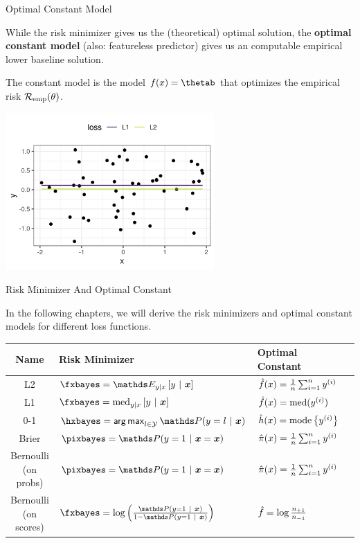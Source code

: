 \begin{vbframe}{Optimal Constant Model}

While the risk minimizer gives us the (theoretical) optimal solution, the \textbf{optimal constant model} (also: featureless predictor) gives us an computable empirical lower baseline solution.

\vspace*{0.2cm}

The constant model is the model $\fx = \thetab$ that optimizes the empirical risk $\mathcal{R}_{\text{emp}}(\theta)$.

\vspace*{-0.5cm}

\begin{center}
	\includegraphics[width = 0.6\textwidth]{figure_man/l1_vs_l2.png}
\end{center}

\end{vbframe}

\begin{vbframe}{Risk Minimizer And Optimal Constant}

In the following chapters, we will derive the risk minimizers and optimal constant models for different loss functions. 

\begin{table}[] 
\footnotesize
\renewcommand{\arraystretch}{1.5} %
  \begin{tabular}{c|lll}
  Name & Risk Minimizer & Optimal Constant\\ \hline
  L2 & $\fxbayes = \E_{y|x} \left[y ~|~ \xv \right]$ & $\hat{f}(x) = \frac{1}{n} \sum_{i=1}^n y^{(i)}$ \\
  L1 & $\fxbayes = \text{med}_{y|x} \left[y ~|~ \xv \right]$ & $\hat{f}(x) = \text{med}(y^{(i)})$\\
  0-1 & $\hxbayes = \argmax_{l \in \Yspace} \P(y = l~|~ \xv)$  & $\hat{h}(x) = \text{mode} \left\{y^{(i)}\right\}$ \\
  Brier & $\pixbayes = \P(y = 1~|~\xv = \xv)$ & $\hat \pi(x) = \frac{1}{n} \sum_{i=1}^n y^{(i)}$\\
  Bernoulli (on probs) & $\pixbayes = \P(y = 1~|~\xv = \xv)$ & $\hat \pi(x) = \frac{1}{n} \sum_{i=1}^n y^{(i)}$\\
  Bernoulli (on scores) & $\fxbayes = \log\left(\frac{\P(y = 1 ~|~\xv)}{1 - \P(y = 1 ~|~\xv)}\right)$ & $\hat{f} = \log \frac{n_{+1}}{n_{-1}}$  
  \end{tabular}
\end{table}


\end{vbframe}






\endlecture

 